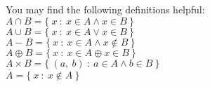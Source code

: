\documentclass[]{exam}
\begin{document}
  \begin{center}
  \end{center}

  \noindent%
  You may find the following definitions helpful:\\[1\baselineskip]
  \noindent%
  $A \cap B = \{\ x\ :\ x \in A \land x \in B\ \}$\\
  $A \cup B = \{\ x\ :\ x \in A \lor x \in B\ \}$\\
  $A - B = \{\ x\ :\ x \in A \land x \notin B\ \}$\\
  $A \oplus B = \{\ x\ :\ x \in A \oplus x \in B\ \}$\\
  $A \times B = \{\ (a,\ b)\ :\ a \in A \land b \in B\ \}$\\
  $\overline{A} = \{\ x\ :\ x \notin A\ \}$
\end{document}
